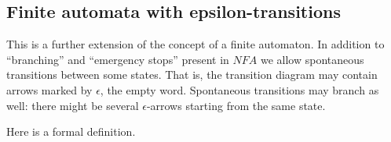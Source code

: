 

\setcounter{section}{1}
\setcounter{subsection}{4}
\setcounter{dfn}{11}

\subsection{Finite automata with epsilon-transitions}
This is a further extension of the concept of a finite automaton.
In addition to ``branching'' and ``emergency stops'' present in $NFA$
we allow spontaneous transitions between some states.
That is, the transition diagram may contain arrows marked by $\epsilon$, the empty word.
Spontaneous transitions may branch as well: there might be several $\epsilon$-arrows starting from the same state.

Here is a formal definition.

